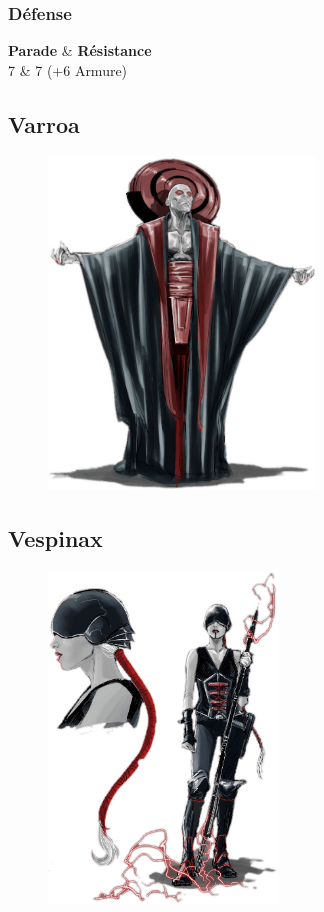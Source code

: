 \subsubsection{Défense}
\begin{itemtable}[ c c ]
    \textbf{Parade}     & \textbf{Résistance} \\
    7                   & 7 (+6 Armure)
\end{itemtable}

\newpage
\subsection{Varroa} \label{sec:varroa}
\begin{figure}[h!]
    \centering
    \includegraphics[height=250pt]{_img/pnjs/varroa.png}
\end{figure}

\newpage
\subsection{Vespinax} \label{sec:vespinax}
\begin{figure}[h!]
    \centering
    \includegraphics[height=250pt]{_img/pnjs/vespinax.png}
\end{figure}
